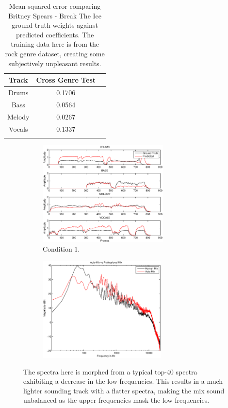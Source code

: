 \documentclass{article}
\begin{document}
\begin{table}[h]
\centering
\begin{tabular}{ccc}
Track  & Cross Genre Test \\ \hline
Drums  & 0.1706           \\
Bass   & 0.0564           \\
Melody & 0.0267          \\
Vocals & 0.1337           \\ \hline
\label{tabel:crossgenre}
\end{tabular}
\caption{Mean squared error comparing Britney Spears - Break The Ice ground truth weights against predicted coefficients.  The training data here is from the rock genre dataset, creating some subjectively unpleasant results.}
\end{table}

\begin{figure}[!htbp]
\centering
\begin{subfigure}{\columnwidth}
\includegraphics[height=200px, width=\columnwidth]{corssgenre1.eps}%
\caption{Condition 1.}
\label{subfiga}%
\end{subfigure}%
\begin{subfigure}{\columnwidth}
\includegraphics[height=200px, width=\columnwidth]{cross_genrespectra.eps}
\label{subfigb}%
\end{subfigure}%
\caption{The spectra here is morphed from a typical top-40 spectra exhibiting a decrease in the low frequencies. This results in a much lighter sounding track with a flatter spectra, making the mix sound unbalanced as the upper frequencies mask the low frequencies.}
\label{fig:crossgenre}
\end{figure}
\end{document}
